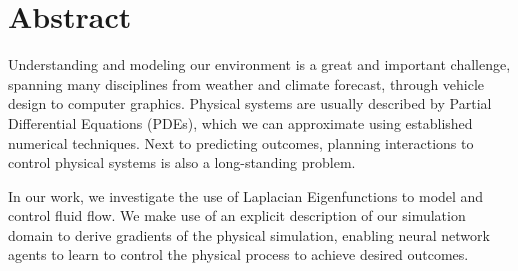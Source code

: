 \chapter*{Abstract}

Understanding and modeling our environment is a great and important challenge,
spanning many disciplines from weather and climate forecast, through vehicle
design to computer graphics. Physical systems are usually described by Partial
Differential Equations (PDEs), which we can approximate using established
numerical techniques. Next to predicting outcomes, planning interactions to
control physical systems is also a long-standing problem.

In our work, we investigate the use of Laplacian Eigenfunctions to model and
control fluid flow. We make use of an explicit description of our simulation
domain to derive gradients of the physical simulation, enabling neural network
agents to learn to control the physical process to achieve desired outcomes.

\vfill
\cleardoublepage

\selectthesislanguage

\setcounter{romanPage}{\value{page}}
